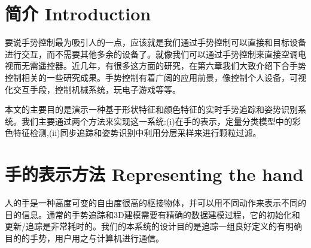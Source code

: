 \documentclass{XDBAthesis}
\begin{document}
\else
\fi
\chapter{简介 Introduction}
要说手势控制最为吸引人的一点，应该就是我们通过手势控制可以直接和目标设备进行交互，而不需要其他多余的设备了。就像我们可以通过手势控制来直接空调电视而无需遥控器。近几年，有很多这方面的研究，在第六章我们大致介绍下合手势控制相关的一些研究成果。手势控制有着广阔的应用前景，像控制个人设备，可视化交互手段，控制机械系统，玩电子游戏等等。

本文的主要目的是演示一种基于形状特征和颜色特征的实时手势追踪和姿势识别系统。我们主要通过两个方法来实现这一系统:(i)在手的表示，定量分类模型中的彩色特征检测,(ii)同步追踪和姿势识别中利用分层采样来进行颗粒过滤。

\chapter{手的表示方法 Representing the hand}
人的手是一种高度可变的自由度很高的枢接物体，并可以用不同动作来表示不同的目的信息。通常的手势追踪和3D建模需要有精确的数据建模过程，它的初始化和更新/追踪是非常耗时的。我们的本系统的设计目的是追踪一组良好定义的有明确目的的手势，用户用之与计算机进行通信。


\ifx\allfiles\undefined
%
%
\end{document}
